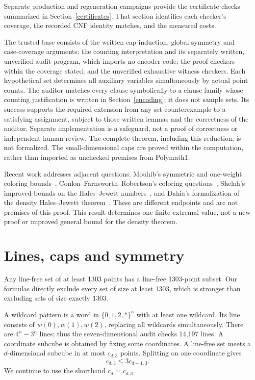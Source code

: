\documentclass[11pt]{article}
\begin{document}
Separate production and regeneration campaigns provide the certificate checks summarized in Section~\ref{certificates}. That section identifies each checker's coverage, the recorded CNF identity matches, and the measured costs.

The trusted base consists of the written cap induction, global symmetry and case-coverage arguments; the counting interpretation and its separately written, unverified audit program, which imports no encoder code; the proof checkers within the coverage stated; and the unverified exhaustive witness checkers. Each hypothetical set determines all auxiliary variables simultaneously by actual point counts. The auditor matches every clause symbolically to a clause family whose counting justification is written in Section~\ref{encoding}; it does not sample sets. Its success supports the required extension from any set counterexample to a satisfying assignment, subject to those written lemmas and the correctness of the auditor. Separate implementation is a safeguard, not a proof of correctness or independent human review. The complete theorem, including this reduction, is not formalized. The small-dimensional caps are proved within the computation, rather than imported as unchecked premises from Polymath1.


Recent work addresses adjacent questions: Mouhib's symmetric and one-weight coloring bounds~\cite{mouhib}, Conlon--Farnsworth--Robertson's coloring questions~\cite{color}, Shelah's improved bounds on the Hales--Jewett numbers~\cite{shelah}, and Dahia's formalization of the density Hales--Jewett theorem~\cite{dahia}. These are different endpoints and are not premises of this proof. This result determines one finite extremal value, not a new proof or improved general bound for the density theorem.

\section{Lines, caps and symmetry}
Any line-free set of at least 1303 points has a line-free 1303-point subset. Our formulas directly exclude every set of size at least 1303, which is stronger than excluding sets of size exactly 1303.

A wildcard pattern is a word in $\{0,1,2,*\}^n$ with at least one wildcard. Its line consists of $w(0),w(1),w(2)$, replacing all wildcards simultaneously. There are $4^n-3^n$ lines; thus the seven-dimensional audit checks 14,197 lines. A coordinate subcube is obtained by fixing some coordinates. A line-free set meets a $d$-dimensional subcube in at most $c_{d,3}$ points. Splitting on one coordinate gives
\begin{equation}\label{split} c_{d,3}\leq 3c_{d-1,3}.\end{equation}
We continue to use the shorthand $c_d=c_{d,3}$.
\end{document}
